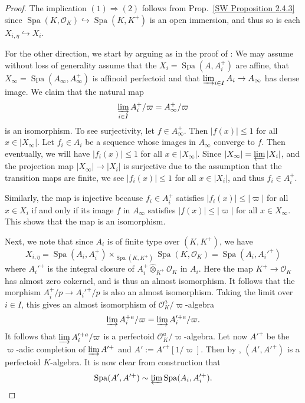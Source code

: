 \documentclass[10pt,oneside]{amsart}
\theoremstyle{definition}
\newcommand{\Spa}{\operatorname{Spa}}
\newcommand{\hotimes}{\hat{\otimes}}
\begin{document}
\begin{proof}
	The implication $(1)\Rightarrow (2)$ follows from Prop.~\ref{SW Proposition 2.4.3} since $\Spa(K,\mathcal O_K)\hookrightarrow \Spa(K,K^+)$ is an open immersion, and thus so is each $X_{i,\eta}\hookrightarrow X_i$.
	
	For the other direction, we start by arguing as in the proof of \cite[Prop. 2.4.5]{SW}: We may assume without loss of generality assume that the $X_i=\Spa(A,A_i^+)$ are affine, that $X_\infty=\Spa(A_\infty,A_\infty^+)$ is affinoid perfectoid and that $\varinjlim_{i\in I} A_i\to A_\infty$ has dense image. We claim that the natural map
	\[\varinjlim_{i\in I}A_i^+/\varpi= A_\infty^{+}/\varpi\]
	is an isomorphism. To see surjectivity, let $f\in A_\infty^+$. Then $|f(x)|\leq 1$ for all $x\in |X_\infty|$. Let $f_i\in A_i$ be a sequence whose images in $A_\infty$ converge to $f$. Then eventually, we will have $|f_i(x)|\leq 1$ for all  $x\in |X_\infty|$. Since $|X_\infty|=\varprojlim |X_i|$, and the projection map $|X_\infty|\to |X_i|$ is surjective due to the assumption that the transition maps are finite, we see $|f_i(x)|\leq 1$ for all $x\in |X_i|$, and thus $f_i\in A_i^+$.
	
	Similarly, the map is injective because $f_i\in A_i^+$ satisfies $|f_i(x)|\leq |\varpi|$ for all $x\in X_i$ if and only if its image $f$ in $A_\infty$ satisfies $|f(x)|\leq |\varpi|$ for all $x\in X_\infty$. This shows that the map is an isomorphism.
	
	
	Next, we note that since $A_i$ is of finite type over $(K,K^+)$, we have \[X_{i,\eta}=\Spa(A_i,A_i^+)\times_{\Spa(K,K^+)}\Spa(K,\mathcal O_K)=\Spa(A_i,A_i'^+)\]
	where $A_i'^+$ is the integral closure of $A_i^+\hotimes_{K^+}\mathcal O_K$ in $A_i$. Here the map $K^+\to \mathcal O_K$ has almost zero cokernel, and is thus an almost isomorphism. It follows that the morphism $A_i^+/p\to A_i'^+/p$ is also an almost isomorphism. Taking the limit over $i\in I$, this gives an almost isomorphism of $\mathcal O_K^a/\varpi$-algebra
	\[\varinjlim A_i^{+a}/\varpi=\varinjlim A'^{+a}_i/\varpi.\]
	It follows that $\varinjlim A'^{+a}_i/\varpi$ is a perfectoid $\mathcal O_K^a/\varpi$-algebra. Let now $A'^{+}$ be the $\varpi$-adic completion of $\varinjlim A'^+$ and $A':=A'^{+}[1/\varpi]$. Then by \cite[Thm. 5.2]{perfectoid}, $(A',A'^+)$ is a perfectoid $K$-algebra. It is now clear from construction that 
	\[\Spa(A',A'^+)\sim \varprojlim\Spa(A_i,A_i'^+).\qedhere\]
\end{proof}
\fi
		
\end{document}
